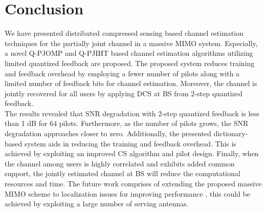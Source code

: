 \section{Conclusion}
We have presented distributed compressed sensing based channel estimation techniques for the partially joint channel in a massive MIMO system.  Especially, a novel Q-PJOMP and Q-PJIHT based channel estimation algorithms utilizing limited quantized feedback are proposed. The proposed system reduces training and feedback overhead by employing a fewer number of pilots along with a limited number of feedback bits for channel estimation. Moreover, the channel is jointly recovered for all users by applying DCS at BS from 2-step quantized feedback. \\
The results revealed that SNR degradation with 2-step quantized feedback is less than 1 dB for 64 pilots. Furthermore, as the number of pilots grows, the SNR degradation approaches closer to zero. Additionally, the presented dictionary-based system aids in reducing the training and feedback overhead. This is achieved by exploiting an improved CS  algorithm and pilot design. Finally, when the channel among users is highly correlated and exhibits added common support, the jointly estimated channel at BS will reduce the computational resources and time. The future work comprises of extending the proposed massive MIMO scheme to localization issues for improving performance  \cite{LocalizationICC2013,LocalizationTVT2016}, this could be achieved by exploiting a large number of serving antennas.
